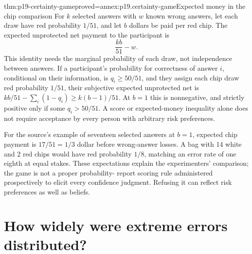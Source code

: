 \begin{hblemma}{thm:p19-certainty-game}{proved=annex:p19.certainty-game}{Expected money in the chip comparison}
For \(k\) selected answers with \(w\) known wrong answers, let each
draw have red probability \(1/51\), and let \(b\) dollars be paid per
red chip. The expected unprotected net payment to the participant is
\[
 \frac{kb}{51}-w.
\]
This identity needs the marginal probability of each draw, not independence
between answers. If a participant's probability for correctness of answer
\(i\), conditional on their information, is \(q_i\geq50/51\), and they
assign each chip draw red probability \(1/51\), their
subjective expected unprotected net is
\(kb/51-\sum_i(1-q_i)\geq k(b-1)/51\).
At \(b=1\) this is nonnegative, and strictly positive only if some
\(q_i>50/51\). A score or expected-money inequality alone does not
require acceptance by every person with arbitrary risk preferences.
\end{hblemma}

For the source's example of seventeen selected answers at \(b=1\),
expected chip payment is \(17/51=1/3\) dollar before wrong-answer losses.
A bag with 14 white and 2 red chips would have red probability \(1/8\),
matching an error rate of one eighth at equal stakes. These expectations
explain the experimenters' comparison; the game is not a proper probability-
report scoring rule administered prospectively to elicit every confidence
judgment. Refusing it can reflect risk preferences as well as beliefs.

\section{How widely were extreme errors distributed?}
\label{sec:p19-certainty-item-person-analyses}

